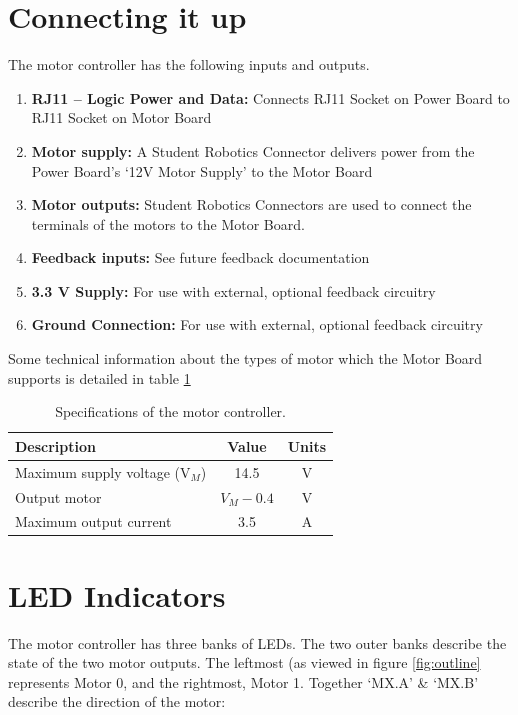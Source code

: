 \documentclass[a4paper]{article}
\begin{document}
\section{Connecting it up}
The motor controller has the following inputs and outputs.
\begin{enumerate}
\item \textbf{RJ11 -- Logic Power and Data:} Connects RJ11 Socket on Power Board to RJ11 Socket on Motor Board  
\item \textbf{Motor supply:} A Student Robotics Connector delivers power from the Power Board's `12V Motor Supply' to the Motor Board
\item \textbf{Motor outputs:} Student Robotics Connectors are used to connect the terminals of the motors to the Motor Board. 
\item \textbf{Feedback inputs:} See future feedback documentation 
\item \textbf{3.3 V Supply:} For use with external, optional feedback circuitry
\item \textbf{Ground Connection:} For use with external, optional feedback circuitry
\end{enumerate}

Some technical information about the types of motor which the Motor Board supports is detailed in table \ref{tab:numspecs}
\begin{table}[h]
  \caption{\label{tab:numspecs}Specifications of the motor controller.}
  \begin{center}
    \begin{tabular}{|l|c|c|}
      \hline
      \textbf{Description} & \textbf{Value} & \textbf{Units} \\
      \hline
      Maximum supply voltage (V$_M$) & 14.5 & V \\
      Output motor & $V_M - 0.4$ & V \\
      Maximum output current & 3.5 & A \\
      \hline
    \end{tabular}
  \end{center}
\end{table}

\section{LED Indicators}
The motor controller has three banks of LEDs. The two outer banks describe the state of the two motor outputs. The leftmost (as viewed in figure \ref{fig:outline} represents Motor 0, and the rightmost, Motor 1. Together `MX.A' \& `MX.B' describe the direction of the motor:
\end{document}
